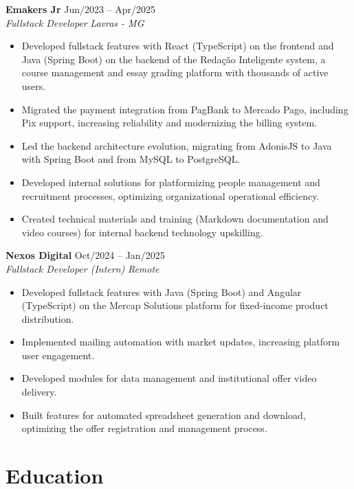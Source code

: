 \documentclass[a4paper,10pt]{article}
\newcommand{\entry}[4]{
  \noindent\textbf{#1} \hfill #2 \\
  \noindent\textit{#3} \hfill \textit{#4} \\
  \vspace{2pt}
}
\begin{document}
\entry{Emakers Jr}{\faCalendar \space Jun/2023 -- Apr/2025}{Fullstack Developer}{\faMapMarker \space Lavras - MG}
\space
\vspace{-1.6em}
\begin{itemize}
\setlength\itemsep{0em}
\item Developed fullstack features with React (TypeScript) on the frontend and Java (Spring Boot) on the backend of the Redação Inteligente system, a course management and essay grading platform with thousands of active users.
\item Migrated the payment integration from PagBank to Mercado Pago, including Pix support, increasing reliability and modernizing the billing system.
\item Led the backend architecture evolution, migrating from AdonisJS to Java with Spring Boot and from MySQL to PostgreSQL.
\item Developed internal solutions for platformizing people management and recruitment processes, optimizing organizational operational efficiency.
\item Created technical materials and training (Markdown documentation and video courses) for internal backend technology upskilling.
\end{itemize}

\entry{Nexos Digital}{\faCalendar \space Oct/2024 -- Jan/2025}{Fullstack Developer (Intern)}{\faMapMarker \space Remote}
\space
\vspace{-1.6em}
\begin{itemize}
\setlength\itemsep{0em}
\item Developed fullstack features with Java (Spring Boot) and Angular (TypeScript) on the Mercap Solutions platform for fixed-income product distribution.
\item Implemented mailing automation with market updates, increasing platform user engagement.
\item Developed modules for data management and institutional offer video delivery.
\item Built features for automated spreadsheet generation and download, optimizing the offer registration and management process.
\end{itemize}

\section*{Education}
\vspace{0.6em}
\end{document}
